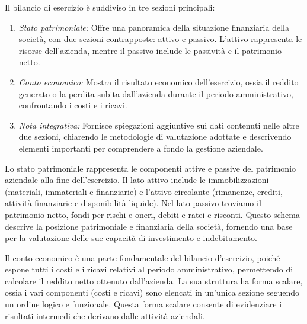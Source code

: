 Il bilancio di esercizio è suddiviso in tre sezioni principali:
\begin{enumerate}
    \item \textit{Stato patrimoniale:} Offre una panoramica della situazione finanziaria della società, con due sezioni contrapposte: attivo e passivo. L’attivo rappresenta le risorse dell’azienda, mentre il passivo include le passività e il patrimonio netto.
    \item \textit{Conto economico:} Mostra il risultato economico dell’esercizio, ossia il reddito generato o la perdita subita dall’azienda durante il periodo amministrativo, confrontando i costi e i ricavi.
    \item \textit{Nota integrativa:} Fornisce spiegazioni aggiuntive sui dati contenuti nelle altre due sezioni, chiarendo le metodologie di valutazione adottate e descrivendo elementi importanti per comprendere a fondo la gestione aziendale.
\end{enumerate}
Lo stato patrimoniale rappresenta le componenti attive e passive del patrimonio aziendale alla fine dell’esercizio. Il lato attivo include le immobilizzazioni (materiali, immateriali e finanziarie) e l’attivo circolante (rimanenze, crediti, attività finanziarie e disponibilità liquide). Nel lato passivo troviamo il patrimonio netto, fondi per rischi e oneri, debiti e ratei e risconti. Questo schema descrive la posizione patrimoniale e finanziaria della società, fornendo una base per la valutazione delle sue capacità di investimento e indebitamento.

Il conto economico è una parte fondamentale del bilancio d’esercizio, poiché espone tutti i costi e i ricavi relativi al periodo amministrativo, permettendo di calcolare il reddito netto ottenuto dall’azienda. La sua struttura ha forma scalare, ossia i vari componenti (costi e ricavi) sono elencati in un’unica sezione seguendo un ordine logico e funzionale. Questa forma scalare consente di evidenziare i risultati intermedi che derivano dalle attività aziendali.

